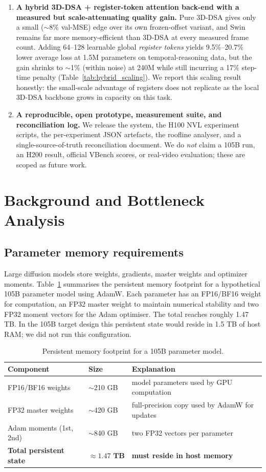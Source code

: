 \documentclass[11pt, letterpaper]{article}
\begin{document}
\begin{enumerate}
    \item \textbf{A hybrid 3D-DSA + register-token attention back-end with a measured but scale-attenuating quality gain.} Pure 3D-DSA gives only a small ($\sim$8\% val-MSE) edge over its own frozen-offset variant, and Swin remains far more memory-efficient than 3D-DSA at every measured frame count. Adding 64--128 learnable global \emph{register tokens} yields 9.5\%--20.7\% lower average loss at 1.5M parameters on temporal-reasoning data, but the gain shrinks to $\sim$1\% (within noise) at 240M while still incurring a 17\% step-time penalty (Table~\ref{tab:hybrid_scaling}). We report this scaling result honestly: the small-scale advantage of registers does not replicate as the local 3D-DSA backbone grows in capacity on this task.
    \item \textbf{A reproducible, open prototype, measurement suite, and reconciliation log.} We release the system, the H100 NVL experiment scripts, the per-experiment JSON artefacts, the roofline analyser, and a single-source-of-truth reconciliation document. We do \emph{not} claim a 105B run, an H200 result, official VBench scores, or real-video evaluation; these are scoped as future work.
\end{enumerate}


\section{Background and Bottleneck Analysis}

\subsection{Parameter memory requirements}
Large diffusion models store weights, gradients, master weights and optimizer moments. Table~\ref{tab:mem_footprint} summarises the persistent memory footprint for a hypothetical 105B parameter model using AdamW. Each parameter has an FP16/BF16 weight for computation, an FP32 master weight to maintain numerical stability and two FP32 moment vectors for the Adam optimiser. The total reaches roughly 1.47 TB. In the 105B target design this persistent state would reside in 1.5 TB of host RAM; we did not run this configuration.

\begin{table}[h]
\centering
\begin{tabular}{lll}
\toprule
\textbf{Component} & \textbf{Size} & \textbf{Explanation} \\
\midrule
FP16/BF16 weights & $\sim$210 GB & model parameters used by GPU computation \\
FP32 master weights & $\sim$420 GB & full-precision copy used by AdamW for updates \\
Adam moments (1st, 2nd) & $\sim$840 GB & two FP32 vectors per parameter \\
\midrule
\textbf{Total persistent state} & $\mathbf{\approx 1.47\text{ TB}}$ & \textbf{must reside in host memory} \\
\bottomrule
\end{tabular}
\caption{Persistent memory footprint for a 105B parameter model.}
\label{tab:mem_footprint}
\end{table}
\end{document}
